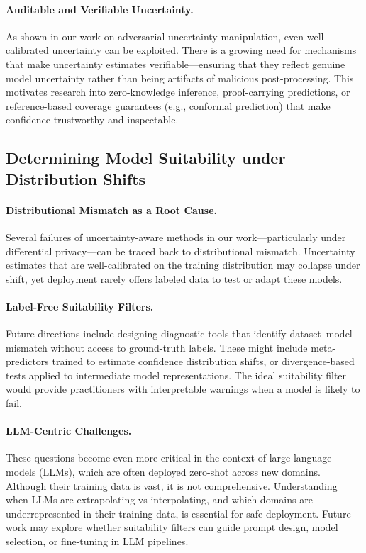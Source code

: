 \paragraph{Auditable and Verifiable Uncertainty.} As shown in our work on adversarial uncertainty manipulation, even well-calibrated uncertainty can be exploited. There is a growing need for mechanisms that make uncertainty estimates verifiable—ensuring that they reflect genuine model uncertainty rather than being artifacts of malicious post-processing. This motivates research into zero-knowledge inference, proof-carrying predictions, or reference-based coverage guarantees (e.g., conformal prediction) that make confidence trustworthy and inspectable.

\subsection{Determining Model Suitability under Distribution Shifts}

\paragraph{Distributional Mismatch as a Root Cause.} Several failures of uncertainty-aware methods in our work—particularly under differential privacy—can be traced back to distributional mismatch. Uncertainty estimates that are well-calibrated on the training distribution may collapse under shift, yet deployment rarely offers labeled data to test or adapt these models.

\paragraph{Label-Free Suitability Filters.} Future directions include designing diagnostic tools that identify dataset–model mismatch without access to ground-truth labels. These might include meta-predictors trained to estimate confidence distribution shifts, or divergence-based tests applied to intermediate model representations. The ideal suitability filter would provide practitioners with interpretable warnings when a model is likely to fail.

\paragraph{LLM-Centric Challenges.} These questions become even more critical in the context of large language models (LLMs), which are often deployed zero-shot across new domains. Although their training data is vast, it is not comprehensive. Understanding when LLMs are extrapolating vs interpolating, and which domains are underrepresented in their training data, is essential for safe deployment. Future work may explore whether suitability filters can guide prompt design, model selection, or fine-tuning in LLM pipelines.

